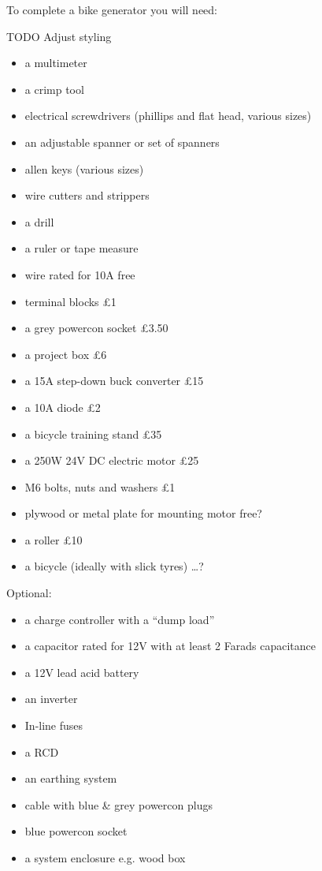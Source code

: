 \documentclass{article}
\theoremstyle{definition}
\theoremstyle{definition}
\theoremstyle{remark}
\begin{document}
    To complete a bike generator you will need: 

    TODO Adjust styling

    \begin{itemize}
      \item a multimeter
      \item a crimp tool
      \item electrical screwdrivers (phillips and flat head, various sizes)
      \item an adjustable spanner or set of spanners
      \item allen keys (various sizes)
      \item wire cutters and strippers
      \item a drill
      \item a ruler or tape measure
      \item wire rated for 10A free
      \item terminal blocks £1
      \item a grey powercon socket £3.50
      \item a project box £6
      \item a 15A step-down buck converter £15
      \item a 10A diode £2
      \item a bicycle training stand £35
      \item a 250W 24V DC electric motor £25
      \item M6 bolts, nuts and washers £1
      \item plywood or metal plate for mounting motor free?
      \item a roller £10
      \item a bicycle (ideally with slick tyres) …?
    \end{itemize}

    Optional:

    \begin{itemize}
      \item a charge controller with a “dump load”
      \item a capacitor rated for 12V with at least 2 Farads capacitance
      \item a 12V lead acid battery
      \item an inverter
      \item In-line fuses
      \item a RCD
      \item an earthing system
      \item cable with blue \& grey powercon plugs
      \item blue powercon socket
      \item a system enclosure e.g. wood box
    \end{itemize}
\end{document}
